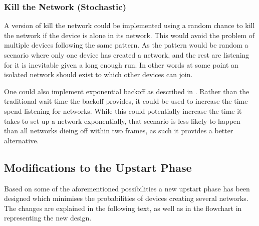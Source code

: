 \subsubsection{Kill the Network (Stochastic)}\label{KtNR}
A version of kill the network could be implemented using a random chance to kill the network if the device is alone in its network.
This would avoid the problem of multiple devices following the same pattern.
As the pattern would be random a scenario where only one device has created a network, and the rest are listening for it is inevitable given a long enough run.
In other words at some point an isolated network should exist to which other devices can join.

One could also implement exponential backoff as described in .
Rather than the traditional wait time the backoff provides, it could be used to increase the time spend listening for networks.
While this could potentially increase the time it takes to set up a network exponentially, that scenario is less likely to happen than all networks dieing off within two frames, as such it provides a better alternative.

\subsection{Modifications to the Upstart Phase}                 
Based on some of the aforementioned possibilities a new upstart phase has been designed which minimises the probabilities of devices creating several networks.
The changes are explained in the following text, as well as in the flowchart in  representing the new design.

